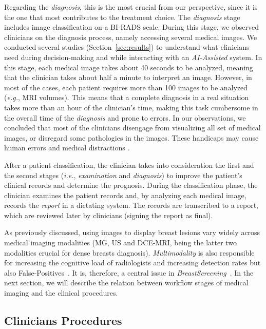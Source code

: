Regarding the {\it diagnosis}, this is the most crucial from our perspective, since it is the one that most contributes to the treatment choice.
The {\it diagnosis} stage includes image classification on a BI-RADS scale.
During this stage, we observed clinicians on the diagnosis process, namely accessing several medical images.
We conducted several studies (Section~\ref{sec:results}) to understand what clinicians need during decision-making and while interacting with an {\it AI-Assisted} system.
In this stage, each medical image takes about 40 seconds to be analyzed, meaning that the clinician takes about half a minute to interpret an image.
However, in most of the cases, each patient requires more than 100 images to be analyzed ({\it e.g.}, MRI volumes).
This means that a complete diagnosis in a real situation takes more than an hour of the clinician's time, making this task cumbersome in the overall time of the {\it diagnosis} and prone to errors.
In our observations, we concluded that most of the clinicians disengage from visualizing all set of medical images, or disregard some pathologies in the images.
These handicaps may cause human errors and medical distractions \cite{bruno2015understanding}.

After a patient classification, the clinician takes into consideration the first and the second stages ({\it i.e.}, {\it examination} and {\it diagnosis}) to improve the patient's clinical records and determine the prognosis.
During the classification phase, the clinician examines the patient records and, by analyzing each medical image, records the {\em report} in a dictating system.
The records are transcribed to a report, which are reviewed later by clinicians (signing the report as final).

As previously discussed, using images to display breast lesions vary widely across medical imaging modalities (MG, US and DCE-MRI, being the latter two modalities crucial for dense breasts diagnosis).
{\it Multimodality} is also responsible for increasing the cognitive load of radiologists and increasing detection rates but also False-Positives~\cite{cheung2017integral}.
It is, therefore, a central issue in {\it BreastScreening}~\cite{https://doi.org/10.13140/rg.2.2.25412.68486, wernli2019surveillance}.
In the next section, we will describe the relation between workflow stages of medical imaging and the clinical procedures.

\subsection{Clinicians Procedures}
\label{sec:workflow}

